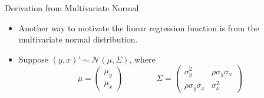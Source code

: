 \documentclass[english,xcolor={dvipsnames},aspectratio=169]{beamer}
\begin{document}
\begin{frame}{Derivation from Multivariate Normal}
\begin{itemize}
	\item Another way to motivate the linear regression function is from the multivariate normal distribution.

	\smallskip
	\item Suppose $\left(y,x\right)' \sim \mathcal{N}\left(\mu,\Sigma\right)$, where\[
\mu=\left(\begin{array}{c}
\mu_{y}\\
\mu_{x}
\end{array}\right)\qquad\qquad\Sigma=\left(\begin{array}{cc}
\sigma_{y}^{2} & \rho\sigma_{y}\sigma_{x}\\
\rho\sigma_{y}\sigma_{x} & \sigma_{x}^{2}
\end{array}\right)
\]


\end{itemize}
\end{frame}
\end{document}
